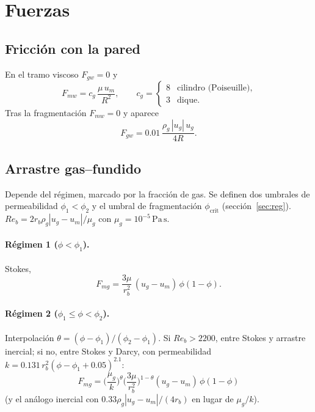 \documentclass[11pt,a4paper]{article}
\begin{document}
\section{Fuerzas}

\subsection{Fricción con la pared}

En el tramo viscoso $F_{gw}=0$ y
\begin{equation}
\label{eq:Fmw}
F_{mw}
=c_g\,\frac{\mu\,u_m}{R^2},
\qquad
c_g
=\begin{cases}
8 & \text{cilindro (Poiseuille)},\\
3 & \text{dique}.
\end{cases}
\end{equation}
Tras la fragmentación $F_{mw}=0$ y aparece
\begin{equation}
F_{gw}=0.01\,\frac{\rho_g\,|u_g|\,u_g}{4R}.
\end{equation}

\subsection{Arrastre gas--fundido}

Depende del régimen, marcado por la fracción de gas. Se definen dos
umbrales de permeabilidad $\phi_1<\phi_2$ y el umbral de
fragmentación $\phi_{\mathrm{crit}}$ (sección~\ref{sec:reg}).
$Re_b=2 r_b\rho_g|u_g-u_m|/\mu_g$ con $\mu_g=10^{-5}\,\mathrm{Pa\,s}$.

\paragraph{Régimen 1 ($\phi<\phi_1$).}
Stokes,
\begin{equation}
F_{mg}=\frac{3\mu}{r_b^2}\,(u_g-u_m)\,\phi(1-\phi).
\end{equation}

\paragraph{Régimen 2 ($\phi_1\le\phi<\phi_2$).}
Interpolación $\theta=(\phi-\phi_1)/(\phi_2-\phi_1)$. Si $Re_b>2200$,
entre Stokes y arrastre inercial; si no, entre Stokes y Darcy, con
permeabilidad
$k=0.131\,r_b^2(\phi-\phi_1+0.05)^{2.1}$:
\begin{equation}
F_{mg}
=\Biggl(\frac{\mu_g}{k}\Biggr)^\theta
\Biggl(\frac{3\mu}{r_b^2}\Biggr)^{1-\theta}
(u_g-u_m)\,\phi(1-\phi)
\end{equation}
(y el análogo inercial con $0.33\rho_g|u_g-u_m|/(4r_b)$ en lugar de
$\mu_g/k$).
\end{document}
